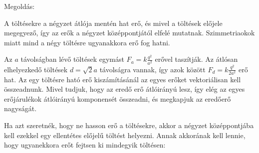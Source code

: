  
\ifdefined\megoldas
 
 Megoldás: 

 A töltésekre a négyzet átlója mentén hat erő, és mivel a töltések előjele megegyező, így az erők a négyzet középpontjától elfelé mutatnak. Szimmetriaokok miatt mind a négy töltésre ugyanakkora erő fog hatni.

 Az $a$ távolságban lévő töltések egymást $F_a=k\frac{q^2}{a^2}$ erővel taszítják. Az átlósan elhelyezkedő töltések $d=\sqrt{2}a$ távolságra vannak, így azok között $F_d=k\frac{q^2}{2a^2}$ erő hat. Az egy töltésre ható erő kiszámításánál az egyes erőket vektoriálisan kell összeadnunk. Mivel tudjuk, hogy az eredő erő átlóirányú lesz, így elég az egyes erőjárulékok átlóirányú komponensét összeadni, és megkapjuk az eredőerő nagyságát. 


 Ha azt szeretnék, hogy ne hasson erő a töltésekre, akkor a négyzet középpontjába kell ezekkel egy ellentétes előjelű töltést helyezni. Annak akkorának kell lennie, hogy ugyanekkora erőt fejtsen ki mindegyik töltésen:

\fi